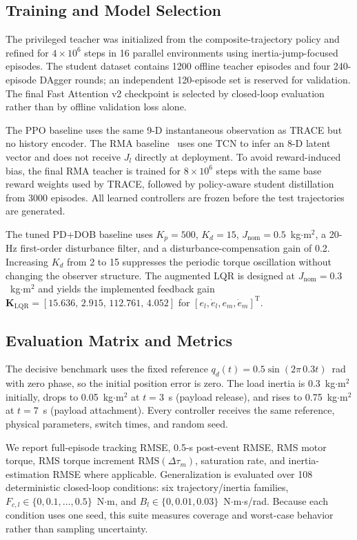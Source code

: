 \subsection{Training and Model Selection}

The privileged teacher was initialized from the composite-trajectory policy and refined for $4\times10^6$ steps in 16 parallel environments using inertia-jump-focused episodes. The student dataset contains 1200 offline teacher episodes and four 240-episode DAgger rounds; an independent 120-episode set is reserved for validation. The final Fast Attention v2 checkpoint is selected by closed-loop evaluation rather than by offline validation loss alone.

The PPO baseline uses the same 9-D instantaneous observation as TRACE but no history encoder. The RMA baseline~\cite{kumar2021RMA} uses one TCN to infer an 8-D latent vector and does not receive $J_l$ directly at deployment. To avoid reward-induced bias, the final RMA teacher is trained for $8\times10^6$ steps with the same base reward weights used by TRACE, followed by policy-aware student distillation from 3000 episodes. All learned controllers are frozen before the test trajectories are generated.

The tuned PD+DOB baseline uses $K_p=500$, $K_d=15$, $J_{\mathrm{nom}}=0.5$~kg$\cdot$m$^2$, a 20-Hz first-order disturbance filter, and a disturbance-compensation gain of 0.2. Increasing $K_d$ from 2 to 15 suppresses the periodic torque oscillation without changing the observer structure. The augmented LQR is designed at $J_{\mathrm{nom}}=0.3$~kg$\cdot$m$^2$ and yields the implemented feedback gain $\bm{K}_{\mathrm{LQR}}=[15.636,\,2.915,\,112.761,\,4.052]$ for $[e_l,\dot e_l,e_m,\dot e_m]^\mathrm{T}$.

\subsection{Evaluation Matrix and Metrics}

The decisive benchmark uses the fixed reference $q_d(t)=0.5\sin(2\pi\,0.3t)$~rad with zero phase, so the initial position error is zero. The load inertia is 0.3~kg$\cdot$m$^2$ initially, drops to 0.05~kg$\cdot$m$^2$ at $t=3$~s (payload release), and rises to 0.75~kg$\cdot$m$^2$ at $t=7$~s (payload attachment). Every controller receives the same reference, physical parameters, switch times, and random seed.

We report full-episode tracking RMSE, 0.5-s post-event RMSE, RMS motor torque, RMS torque increment $\mathrm{RMS}(\Delta\tau_m)$, saturation rate, and inertia-estimation RMSE where applicable. Generalization is evaluated over 108 deterministic closed-loop conditions: six trajectory/inertia families, $F_{c,l}\in\{0,0.1,\ldots,0.5\}$~N$\cdot$m, and $B_l\in\{0,0.01,0.03\}$~N$\cdot$m$\cdot$s/rad. Because each condition uses one seed, this suite measures coverage and worst-case behavior rather than sampling uncertainty.

